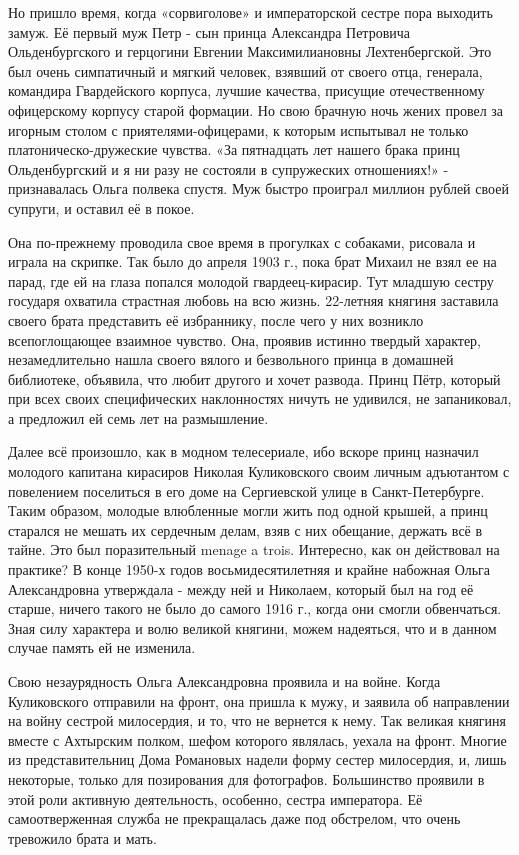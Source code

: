 Но пришло время, когда «сорвиголове» и императорской сестре пора выходить
замуж. Её первый муж Петр - сын принца Александра Петровича Ольденбургского и
герцогини Евгении Максимилиановны Лехтенбергской. Это был очень симпатичный и
мягкий человек, взявший от своего отца, генерала, командира Гвардейского
корпуса, лучшие качества, присущие отечественному офицерскому корпусу старой
формации. Но свою брачную ночь жених провел за игорным столом с
приятелями-офицерами, к которым испытывал не только платоническо-дружеские
чувства. «За пятнадцать лет нашего брака принц Ольденбургский и я ни разу не
состояли в супружеских отношениях!» - признавалась Ольга полвека спустя. Муж
быстро проиграл миллион рублей своей супруги, и оставил её в покое. 

Она по-прежнему проводила свое время в прогулках
с собаками, рисовала и играла на скрипке. Так было до апреля 1903 г., пока брат
Михаил не взял ее на парад, где ей на глаза попался молодой гвардеец-кирасир.
Тут младшую сестру государя охватила страстная любовь на всю жизнь. 22-летняя
княгиня заставила своего брата представить её избраннику, после чего у них
возникло всепоглощающее взаимное чувство. Она, проявив истинно твердый
характер, незамедлительно нашла своего вялого и безвольного принца в домашней
библиотеке, объявила, что любит другого и хочет развода. Принц Пётр, который
при всех своих специфических наклонностях ничуть не удивился, не запаниковал, а
предложил ей семь лет на размышление. 


Далее всё произошло, как в модном
телесериале, ибо вскоре принц назначил молодого капитана кирасиров Николая
Куликовского своим личным адъютантом с повелением поселиться в его доме на
Сергиевской улице в Санкт-Петербурге. Таким образом, молодые влюбленные могли
жить под одной крышей, а принц старался не мешать их сердечным делам, взяв с
них обещание, держать всё в тайне. Это был поразительный menage a trois.
Интересно, как он действовал на практике? В конце 1950-х годов
восьмидесятилетняя и крайне набожная Ольга Александровна утверждала - между ней
и Николаем, который был на год её старше, ничего такого не было до самого 1916
г., когда они смогли обвенчаться. Зная силу характера и волю великой княгини,
можем надеяться, что и в данном случае память ей не изменила.

Свою незаурядность Ольга Александровна проявила и на войне. Когда Куликовского
отправили на фронт, она пришла к мужу, и заявила об направлении на войну
сестрой милосердия, и то, что не вернется к нему. Так великая княгиня вместе с
Ахтырским полком, шефом которого являлась, уехала на фронт. Многие из
представительниц Дома Романовых надели форму сестер милосердия, и, лишь
некоторые, только для позирования для фотографов. Большинство проявили в этой
роли активную деятельность, особенно, сестра императора. Её самоотверженная
служба не прекращалась даже под обстрелом, что очень тревожило брата и мать.

